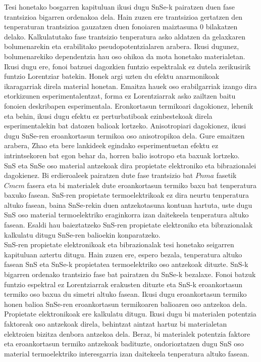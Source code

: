 Tesi honetako bosgarren kapituluan ikusi dugu SnSe-k pairatzen duen fase trantsizioa bigarren ordenakoa dela. Hain 
zuzen ere trantsizioa gertatzen den tenperaturan trantsizioa gauzatzen duen fonoiaren maiztasuna 0 bilakatzen delako. 
Kalkulatutako fase trantsizio tenperatura asko aldatzen da gelaxkaren bolumenarekin eta erabilitako 
pseudopotentzialaren arabera. Ikusi dugunez, bolumenarekiko dependentzia hau oso ohikoa da mota honetako 
materialetan. Ikusi dugu ere, fonoi batzuei dagozkien funtzio espektralak ez dutela zerikusirik funtzio Lorentziar 
batekin. Honek argi uzten du efektu anarmonikoak ikaragarriak direla material honetan. Emaitza hauek oso 
erabilgarriak izango dira etorkizunen esperimentalentzat, forma ez Lorentziarrak asko zailtzen baitu fonoien 
deskribapen esperimentala. Eronkortasun termikoari dagokionez, lehenik eta behin, ikusi dugu efektu ez 
perturbatiboak ezinbestekoak direla esperimentalekin bat datozen balioak lortzeko. Anisotropiari dagokionez, ikusi 
dugu SnSe-ren eroankortasun termikoa oso anisotropikoa dela. Gure emaitzen arabera, Zhao eta bere lankideek egindako 
esperimentuetan efektu ez intrintsekoren bat egon behar da, horren balio isotropo eta baxuak lortzeko. \\

SnS eta SnSe oso material antzekoak dira propietate elektroniko eta bibrazionalei\cite{guo2015first} dagokienez. Bi 
erdieroaleek pairatzen dute fase trantsizio bat $Pnma$ fasetik $Cmcm$ 
fasera\cite{chattopadhyay1986neutron,von1981high} eta bi materialek dute eroankortasun termiko baxu bat tenperatura 
baxuko fasean. SnS-ren propietate termoelektrikoak ez dira neurtu tenperatura altuko fasean, baina SnSe-rekin duen 
antzekotasuna kontuan hartuta, uste dugu SnS oso material termoelektriko eraginkorra izan daitekeela tenperatura 
altuko fasean. Esaldi hau baieztatzeko SnS-ren propietate elektroniko eta bibrazionalak kalkulatu ditugu SnSe-ren 
balioekin konparatzeko. \\

SnS-ren propietate elektronikoak eta bibrazionalak tesi honetako seigarren kapituluan aztertu ditugu.
Hain zuzen ere, espero bezala, tenperatura altuko fasean SnS eta SnSe-k propietatea termoelektriko oso antzekoak 
dituzte. SnS-k bigarren ordenako trantsizio fase bat pairatzen du SnSe-k bezalaxe. Fonoi batzuk funtzio espektral 
ez Lorentziarrak erakusten dituzte eta SnS-k eroankortasun termiko oso baxua du simetri altuko fasean. Ikusi dugu 
eroankortasun termiko honen balioa SnSe-ren eroankortasun termikoaren balioaren oso antzekoa dela. Propietate 
elektronikoak ere kalkulatu ditugu. Ikusi dugu bi materialen potentzia faktoreak oso antzekoak direla, behintzat
aintzat hartuz bi materialetan elektroien bizitza denbora antzekoa dela. Beraz, bi materialek potentzia faktore 
eta eroankortasun termiko antzekoak badituzte, ondorioztatzen dugu SnS oso material termoelektriko interesgarria 
izan daitekeela tenperatura altuko fasean. \\

